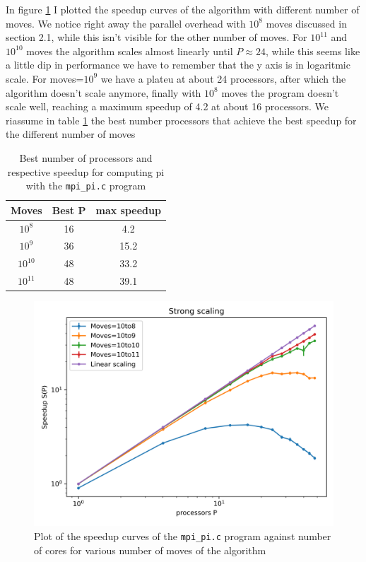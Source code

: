 \documentclass[a4paper]{article}
\begin{document}
In figure \ref{fig:strong_speedup} I plotted the speedup curves of the algorithm with different number of moves. We notice right away the parallel overhead with $10^8$ moves discussed in section 2.1, while this isn't visible for the other number of moves. For $10^{11}$ and $10^{10}$ moves the algorithm scales almost linearly until $P\approx 24$, while this seems like a little dip in performance we have to remember that the y axis is in logaritmic scale. For moves=$10^9$ we have a plateu at about 24 processors, after which the algorithm doesn't scale anymore, finally with $10^8$ moves the program doesn't scale well, reaching a maximum speedup of 4.2 at about 16 processors. We riassume in table \ref{tab:speedup_strong} the best number processors that achieve the best speedup for the different number of moves

\begin{table}[h]
    \centering
    \begin{tabular}{ccc}
        Moves & Best P & max speedup\\
        \hline\hline
        $10^{8}$ & 16 &4.2\\
        $10^{9}$ & 36 &15.2\\
        $10^{10}$ & 48 &33.2\\
        $10^{11}$ & 48 &39.1\\
        \hline
    \end{tabular}
    \caption{Best number of processors and respective speedup for computing pi with the \texttt{mpi\_pi.c} program}
    \label{tab:speedup_strong}
\end{table}

\begin{figure}[hbt!]
    \centering
    \includegraphics[scale=0.7]{strong_scaling_speedup.png}
    \caption{Plot of the speedup curves of the \texttt{mpi\_pi.c} program against number of cores for various number of moves of the algorithm}
    \label{fig:strong_speedup}
\end{figure}
\end{document}

